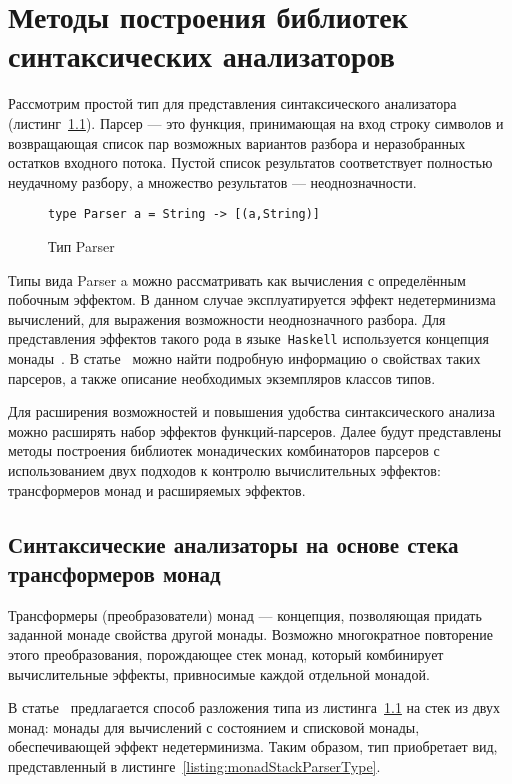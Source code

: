 \chapter{Методы построения библиотек синтаксических анализаторов}

Рассмотрим простой тип для представления синтаксического анализатора 
(листинг~\ref{listing:basicParserType}). Парсер --- это функция, 
принимающая на вход строку символов и возвращающая список пар возможных вариантов  
разбора и неразобранных остатков входного потока. Пустой список результатов 
соответствует полностью неудачному разбору, а множество результатов --- 
неоднозначности.

\begin{figure}[h]
\begin{lstlisting}
type Parser a = String -> [(a,String)]
\end{lstlisting}
\caption{Тип Parser}
\label{listing:basicParserType}
\end{figure}

Типы вида Parser a можно рассматривать как вычисления с
определённым побочным эффектом. В данном случае эксплуатируется эффект 
недетерминизма вычислений, для выражения возможности неоднозначного разбора.
Для представления эффектов такого рода в языке~\lstinline{Haskell} используется
концепция монады~\cite{wadlerMonads}. В статье~\cite{monParsing} можно найти 
подробную информацию о свойствах таких парсеров, а также описание необходимых 
экземпляров классов типов.

Для расширения возможностей и повышения удобства синтаксического анализа можно расширять
набор эффектов функций-парсеров. Далее будут представлены методы построения библиотек
монадических комбинаторов парсеров с использованием двух подходов к контролю
вычислительных эффектов: трансформеров монад и расширяемых эффектов. 

\section{Синтаксические анализаторы на основе стека трансформеров монад}

  Трансформеры (преобразователи) монад --- концепция, позволяющая придать заданной 
  монаде свойства другой монады. Возможно многократное повторение этого преобразования, 
  порождающее стек монад, который комбинирует вычислительные эффекты, привносимые 
  каждой отдельной монадой.

  В статье~\cite{monParsing} предлагается способ разложения типа из 
  листинга~\ref{listing:basicParserType} на стек из двух монад: монады для вычислений 
  с состоянием и списковой монады, обеспечивающей эффект недетерминизма. Таким образом, 
  тип приобретает вид, представленный в листинге~\ref{listing:monadStackParserType}.

